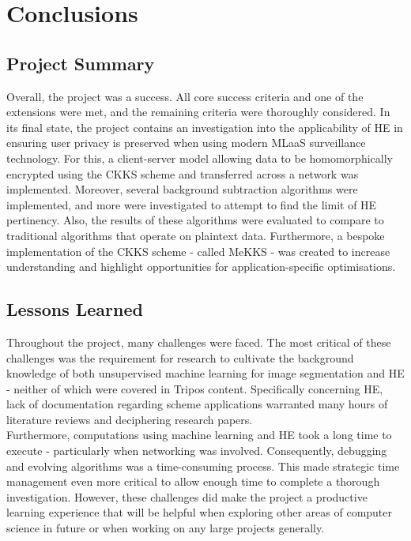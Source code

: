 \chapter{Conclusions}
\label{chap:conclusions}

\section{Project Summary}
\setlength{\leftskip}{0.25cm}
\indent \indent
Overall, the project was a success. All core success criteria and one of the extensions were met, and the remaining criteria were thoroughly considered. In its final state, the project contains an investigation into the applicability of HE in ensuring user privacy is preserved when using modern MLaaS surveillance technology. For this, a client-server model allowing data to be homomorphically encrypted using the CKKS scheme and transferred across a network was implemented. Moreover, several background subtraction algorithms were implemented, and more were investigated to attempt to find the limit of HE pertinency. Also, the results of these algorithms were evaluated to compare to traditional algorithms that operate on plaintext data. Furthermore, a bespoke implementation of the CKKS scheme - called MeKKS - was created to increase understanding and highlight opportunities for application-specific optimisations.

\setlength{\leftskip}{0cm}





\section{Lessons Learned}
\setlength{\leftskip}{0.25cm}
\indent \indent
Throughout the project, many challenges were faced. The most critical of these challenges was the requirement for research to cultivate the background knowledge of both unsupervised machine learning for image segmentation and HE - neither of which were covered in Tripos content. Specifically concerning HE, lack of documentation regarding scheme applications warranted many hours of literature reviews and deciphering research papers. 
\smallskip \\ \indent
Furthermore, computations using machine learning and HE took a long time to execute - particularly when networking was involved. Consequently, debugging and evolving algorithms was a time-consuming process. This made strategic time management even more critical to allow enough time to complete a thorough investigation. However, these challenges did make the project a productive learning experience that will be helpful when exploring other areas of computer science in future or when working on any large projects generally.

